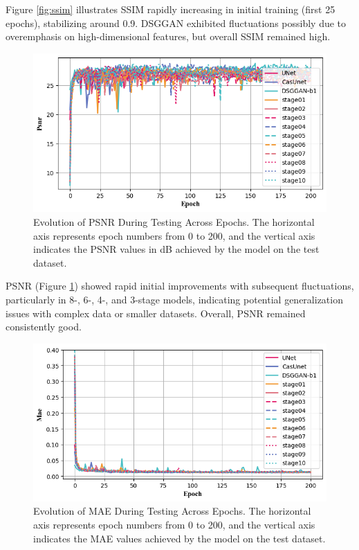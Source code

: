 \documentclass[a4paper, times, 10pt,twocolumn]{article}
\begin{document}
Figure \ref{fig:ssim} illustrates SSIM rapidly increasing in initial training (first 25 epochs), stabilizing around 0.9. DSGGAN exhibited fluctuations possibly due to overemphasis on high-dimensional features, but overall SSIM remained high.

\begin{figure}[h]
	\centering
	\includegraphics[width=1.0\linewidth]{u-net/lung/csvimg_lung_mnv3/psnr_comparison.png}
	\caption[psnr]{Evolution of PSNR During Testing Across Epochs. The horizontal axis represents epoch numbers from 0 to 200, and the vertical axis indicates the PSNR values in dB achieved by the model on the test dataset.}
	\label{fig:psnr}
\end{figure}

PSNR (Figure \ref{fig:psnr}) showed rapid initial improvements with subsequent fluctuations, particularly in 8-, 6-, 4-, and 3-stage models, indicating potential generalization issues with complex data or smaller datasets. Overall, PSNR remained consistently good.

\begin{figure}[h]
	\centering
	\includegraphics[width=1.0\linewidth]{u-net/lung/csvimg_lung_mnv3/mae_comparison.png}
	\caption[mae]{Evolution of MAE During Testing Across Epochs. The horizontal axis represents epoch numbers from 0 to 200, and the vertical axis indicates the MAE values achieved by the model on the test dataset.}
	\label{fig:mae}
\end{figure}
\end{document}
